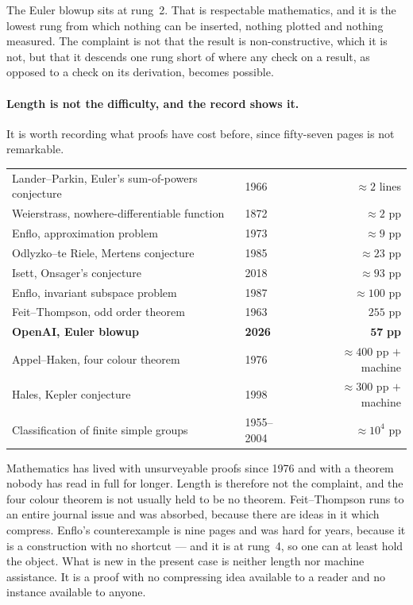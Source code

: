 \documentclass[11pt]{article}
\begin{document}
The Euler blowup sits at rung~2. That is respectable mathematics, and it is the lowest rung from
which nothing can be inserted, nothing plotted and nothing measured. The complaint is not that the
result is non-constructive, which it is not, but that it descends one rung short of where any check
on a result, as opposed to a check on its derivation, becomes possible.

\paragraph{Length is not the difficulty, and the record shows it.} It is worth recording what proofs
have cost before, since fifty-seven pages is not remarkable.

\begin{center}\small
\begin{tabular}{llr}
\hline
Lander--Parkin, Euler's sum-of-powers conjecture & 1966 & $\approx 2$ lines \\
Weierstrass, nowhere-differentiable function & 1872 & $\approx 2$ pp \\
Enflo, approximation problem & 1973 & $\approx 9$ pp \\
Odlyzko--te Riele, Mertens conjecture & 1985 & $\approx 23$ pp \\
Isett, Onsager's conjecture & 2018 & $\approx 93$ pp \\
Enflo, invariant subspace problem & 1987 & $\approx 100$ pp \\
Feit--Thompson, odd order theorem & 1963 & $255$ pp \\
\textbf{OpenAI, Euler blowup} & \textbf{2026} & $\mathbf{57}$ \textbf{pp} \\
Appel--Haken, four colour theorem & 1976 & $\approx 400$ pp $+$ machine \\
Hales, Kepler conjecture & 1998 & $\approx 300$ pp $+$ machine \\
Classification of finite simple groups & 1955--2004 & $\approx 10^4$ pp \\
\hline
\end{tabular}
\end{center}

Mathematics has lived with unsurveyable proofs since 1976 and with a theorem nobody has read in full
for longer. Length is therefore not the complaint, and the four colour theorem is not usually held to
be no theorem. Feit--Thompson runs to an entire journal issue and was absorbed, because there are
ideas in it which compress. Enflo's counterexample is nine pages and was hard for years, because it
is a construction with no shortcut --- and it is at rung~4, so one can at least hold the object.
What is new in the present case is neither length nor machine assistance. It is a proof with no
compressing idea available to a reader and no instance available to anyone.
\end{document}
